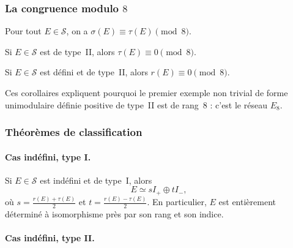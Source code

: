 \subsubsection{La congruence modulo $8$}

\begin{theorem}
\label{thm:mod8}
Pour tout $E \in \mathcal{S}$, on a $\sigma(E) \equiv \tau(E) \pmod{8}$.
\end{theorem}

\begin{corollary}
\label{cor:typeII_mod8}
Si $E \in \mathcal{S}$ est de type~II, alors $\tau(E) \equiv 0 \pmod{8}$.
\end{corollary}

\begin{corollary}
Si $E \in \mathcal{S}$ est défini et de type~II, alors $r(E) \equiv 0 \pmod{8}$.
\end{corollary}

\begin{remark}
Ces corollaires expliquent pourquoi le premier exemple non trivial de forme unimodulaire
définie positive de type~II est de rang~$8$ : c'est le réseau $E_8$.
\end{remark}

\subsubsection{Théorèmes de classification}

\paragraph{Cas indéfini, type I.}

\begin{theorem}
\label{thm:indefI}
Si $E \in \mathcal{S}$ est indéfini et de type~I, alors
\[
  E \simeq sI_+ \oplus tI_-,
\]
où $s = \frac{r(E)+\tau(E)}{2}$ et $t = \frac{r(E)-\tau(E)}{2}$.
En particulier, $E$ est entièrement déterminé à isomorphisme près par son rang et son
indice.
\end{theorem}

\paragraph{Cas indéfini, type II.}

